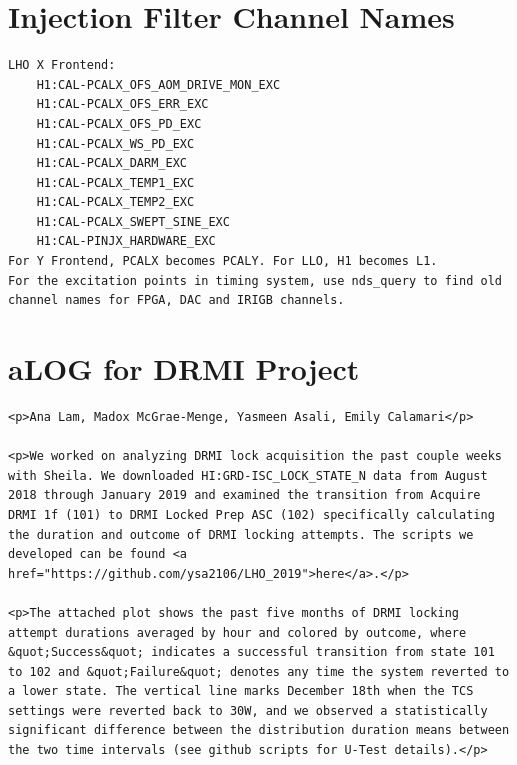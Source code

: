 \documentclass{article}
\begin{document}
\section{Injection Filter Channel Names}
\label{sec:channels}
\begin{lstlisting}
LHO X Frontend:
    H1:CAL-PCALX_OFS_AOM_DRIVE_MON_EXC
    H1:CAL-PCALX_OFS_ERR_EXC
    H1:CAL-PCALX_OFS_PD_EXC
    H1:CAL-PCALX_WS_PD_EXC
    H1:CAL-PCALX_DARM_EXC
    H1:CAL-PCALX_TEMP1_EXC
    H1:CAL-PCALX_TEMP2_EXC
    H1:CAL-PCALX_SWEPT_SINE_EXC
    H1:CAL-PINJX_HARDWARE_EXC
For Y Frontend, PCALX becomes PCALY. For LLO, H1 becomes L1.
For the excitation points in timing system, use nds_query to find old channel names for FPGA, DAC and IRIGB channels. 
\end{lstlisting}
\clearpage

\section{aLOG for DRMI Project}
\lstset{language=HTML}
\begin{lstlisting}
<p>Ana Lam, Madox McGrae-Menge, Yasmeen Asali, Emily Calamari</p>

<p>We worked on analyzing DRMI lock acquisition the past couple weeks with Sheila. We downloaded HI:GRD-ISC_LOCK_STATE_N data from August 2018 through January 2019 and examined the transition from Acquire DRMI 1f (101) to DRMI Locked Prep ASC (102) specifically calculating the duration and outcome of DRMI locking attempts. The scripts we developed can be found <a href="https://github.com/ysa2106/LHO_2019">here</a>.</p>

<p>The attached plot shows the past five months of DRMI locking attempt durations averaged by hour and colored by outcome, where &quot;Success&quot; indicates a successful transition from state 101 to 102 and &quot;Failure&quot; denotes any time the system reverted to a lower state. The vertical line marks December 18th when the TCS settings were reverted back to 30W, and we observed a statistically significant difference between the distribution duration means between the two time intervals (see github scripts for U-Test details).</p>

\end{lstlisting}
\clearpage
\end{document}
